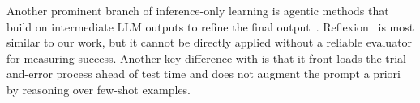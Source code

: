 Another prominent branch of inference-only learning is agentic methods that build on intermediate LLM outputs to refine the final output~\cite{chen-etal-2023-self, wei2022chain, yao2023react, sumers2024cognitive, shinn2024reflexion, saha-etal-2024-branch}. 
Reflexion~\cite{shinn2024reflexion} is most similar to our work, but it cannot be directly applied without a reliable evaluator for measuring success. 
Another key difference with \ours is that it front-loads the trial-and-error process ahead of test time and does not augment the prompt a priori by reasoning over few-shot examples. 










